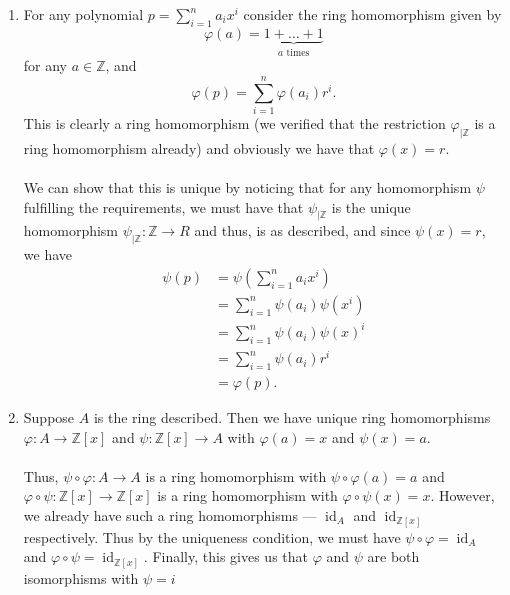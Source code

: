 \documentclass[letterpaper, 12pt]{hmcpset}
\begin{document}
\begin{solution}
	\begin{enumerate}
		\item For any polynomial $p = \sum_{i = 1}^n a_i x^i$ consider the ring homomorphism given by
			\[
				\varphi(a) = \underbrace{1 + \dots + 1}_{a \text{ times}}
			\]
			for any $a \in \mathbb{Z}$, and
			\[
				\varphi(p) = \sum_{i = 1}^n \varphi(a_i) r^i.
			\]
			This is clearly a ring homomorphism (we verified that the restriction $\varphi_{| \mathbb{Z}}$ is a ring homomorphism already) and obviously we have that ${\varphi(x) = r}$.\\\\
			We can show that this is unique by noticing that for any homomorphism $\psi$ fulfilling the requirements, we must have that $\psi_{| \mathbb{Z}}$ is the unique homomorphism $\psi_{|\mathbb{Z}} : \mathbb{Z} \to R$ and thus, is as described, and since $\psi(x) = r$, we have
			\[
				\begin{split}
					\psi(p) & = \psi \left ( \sum_{i = 1}^n a_i x^i \right ) \\
						& = \sum_{i = 1}^n \psi(a_i) \psi(x^i) \\
						& = \sum_{i = 1}^n \psi(a_i) \psi(x)^i \\
						& = \sum_{i = 1}^n \psi(a_i) r^i \\
						& = \varphi(p).
				\end{split}
			\]
		\item Suppose $A$ is the ring described. Then we have unique ring homomorphisms ${\varphi : A \to \mathbb Z[x]}$ and $\psi : \mathbb Z[x] \to A$ with $\varphi(a) = x$ and $\psi(x) = a$.\\\\ 
			Thus, $\psi \circ \varphi: A \to A$ is a ring homomorphism with $\psi \circ \varphi(a) = a$ and $\varphi \circ \psi : \mathbb Z[x] \to \mathbb Z[x]$ is a ring homomorphism with $\varphi \circ \psi(x) = x$. However, we already have such a ring homomorphisms --- $\operatorname{id}_A$ and $\operatorname{id}_{\mathbb Z[x]}$ respectively. Thus by the uniqueness condition, we must have $\psi \circ \varphi = \operatorname{id}_A$ and $\varphi \circ \psi = \operatorname{id}_{\mathbb Z[x]}$. Finally, this gives us that $\varphi$ and $\psi$ are both isomorphisms with $\psi = i$
	\end{enumerate}
\end{solution}

\pagebreak
\end{document}
